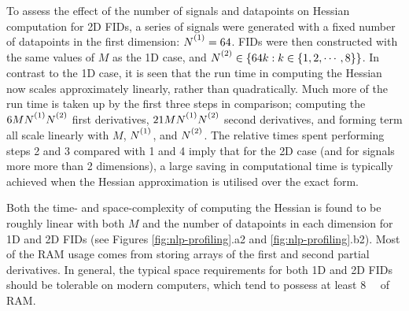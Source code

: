 To assess the effect of the number of signals and datapoints on Hessian
computation for \ac{2D} \acp{FID}, a series of signals were generated with a
fixed number of datapoints in the first dimension: $\None = 64$. \acp{FID} were
then constructed with the same values of $M$ as the \ac{1D} case, and $\Ntwo
\in \lbrace 64k : k \in \lbrace 1, 2, \cdots, 8 \rbrace \rbrace$. In contrast to
the \ac{1D} case, it is seen that the run time in computing the Hessian now
scales approximately linearly, rather than quadratically. Much more of the run
time is taken up by the first three steps in comparison; computing the
$6M\None\Ntwo$ first derivatives, $21M\None\Ntwo$ second derivatives, and
forming term  all scale linearly with $M$, $\None$, and $\Ntwo$. The
relative times spent performing steps 2 and 3 compared with 1 and 4 imply that for
the \ac{2D} case (and for signals more more than 2 dimensions), a large saving
in computational time is typically achieved when the Hessian approximation
is utilised over the exact form.

Both the time- and space-complexity of computing the Hessian is found to be
roughly linear with both $M$ and the number of datapoints in each dimension
for \ac{1D} and \ac{2D} \acp{FID} (see Figures \ref{fig:nlp-profiling}.a2 and
\ref{fig:nlp-profiling}.b2). Most of the \ac{RAM} usage comes from storing
arrays of the first and second partial derivatives. In general, the typical
space requirements for both \ac{1D} and \ac{2D} \acp{FID} should be tolerable
on modern computers, which tend to possess at least \qty{8}{\gibi\byte} of
\ac{RAM}.
